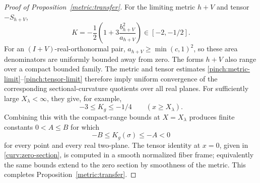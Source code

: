 \begin{proof}[Proof of Proposition~\ref{metric:transfer}]
For the limiting metric \(h+V\) and tensor \(-S_{h+V}\),
\[
 K=-\frac12\left(1+
     3\frac{b_{h+V}^2}{a_{h+V}}\right)
 \in[-2,-1/2].
\]
For an \((I+V)\)-real-orthonormal pair,
\(a_{h+V}\ge\min(c,1)^2\), so these area denominators are uniformly
bounded away from zero.  The forms \(h+V\) also range over a compact
bounded family.  The metric and tensor estimates
\eqref{pinch:metric-limit}--\eqref{pinch:tensor-limit} therefore imply
uniform convergence of the corresponding sectional-curvature
quotients over all real planes.
For sufficiently large \(X_\lambda<\infty\), they give, for example,
\[
 -3\le K_g\le-1/4\qquad(x\ge X_\lambda).
\]
Combining this with the compact-range bounds at \(X=X_\lambda\)
produces finite constants \(0<A\le B\) for which
\[
 -B\le K_g(\sigma)\le-A<0
\]
for every point and every real two-plane.
The tensor identity at \(x=0\), given in
\eqref{curv:zero-section}, is computed in a smooth normalized
fiber frame; equivalently the same bounds extend to the zero section
by smoothness of the metric.
This completes Proposition~\ref{metric:transfer}.
\end{proof}
